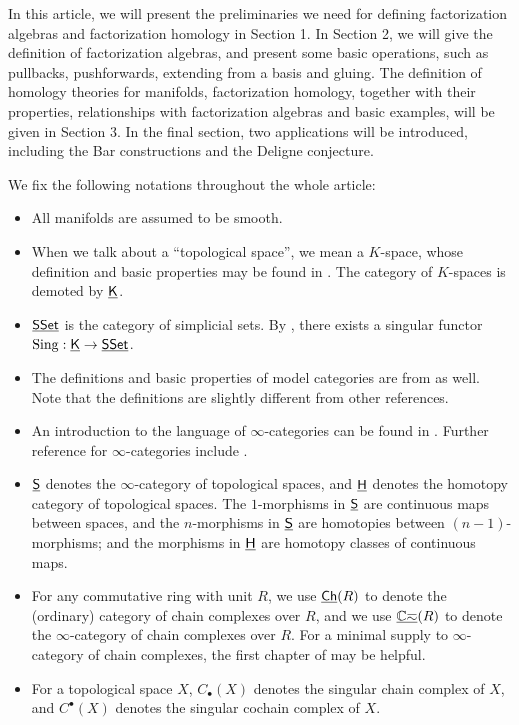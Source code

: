 \documentclass[twoside]{article}
\begin{document}
In this article, we will present the preliminaries we need for defining
factorization algebras and factorization homology in Section 1.
In Section 2, we will give the definition of
factorization algebras, and present some basic operations, such as pullbacks,
pushforwards, extending from a basis and gluing. The definition of 
homology theories for manifolds, factorization homology, together with their
properties, relationships with factorization algebras and basic examples,
will be given in Section 3. In the final section, two applications will be 
introduced, including the Bar constructions and the Deligne conjecture.

\begin{notation}
    We fix the following notations throughout the whole article:
    \begin{itemize}
    \item All manifolds are assumed to be smooth.
    \item When we talk about a ``topological space'', we mean a $K$-space, whose
    definition and basic properties may be found in \cite{Hov99}. The category
    of $K$-spaces is demoted by $\K$.
    \item $\SSet$ is the category of simplicial sets. By \cite{Hov99},
    there exists a singular functor $\Sing:\K\to\SSet$.
    \item The definitions and basic properties of model categories are from
    \cite{Hov99} as well. Note that the definitions are slightly different from
    other references.
    \item An introduction to the language of $\infty$-categories can be found in \cite{Lur09}.
    Further reference for $\infty$-categories include \cite{Lur16}.
    \item $\S$ denotes the $\infty$-category of topological spaces, and $\H$
    denotes the homotopy category of topological spaces. 
    The $1$-morphisms in $\S$ are continuous maps between spaces, and
    the $n$-morphisms in $\S$ are homotopies between $(n-1)$-morphisms;
    and the morphisms in $\H$ are homotopy classes of continuous maps.
    \item For any commutative ring with unit $R$, we use $\Ch(R)$ to denote
    the (ordinary) category of chain complexes over $R$, and we use $\Chinf(R)$
    to denote the $\infty$-category of chain complexes over $R$. 
    For a minimal supply to $\infty$-category of chain complexes, the first chapter of
    \cite{Lur16} may be helpful.
    \item For a topological space $X$, $C_\bullet(X)$ denotes the singular chain
    complex of $X$, and $C^\bullet(X)$ denotes the singular cochain
    complex of $X$.
    \end{itemize}
\end{notation}
\end{document}

